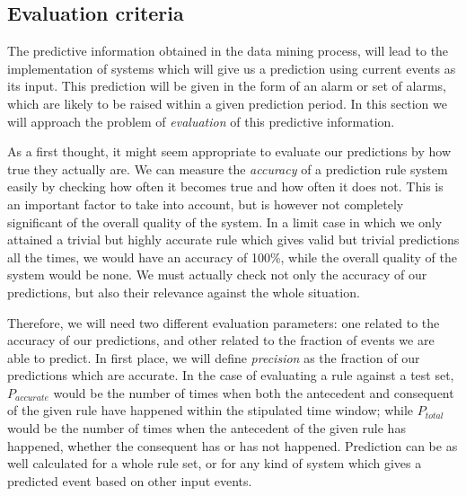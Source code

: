 \documentclass[a4paper,12pt]{article}
\begin{document}

\subsection{Evaluation criteria}
The predictive information obtained in the data mining process, will lead to the implementation of systems which will give us a prediction using current events as its input. This prediction will be given in the form of an alarm or set of alarms, which are likely to be raised within a given prediction period. In this section we will approach the problem of \emph{evaluation} of this predictive information.

As a first thought, it might seem appropriate to evaluate our predictions by how true they actually are. We can measure the \emph{accuracy} of a prediction rule system easily by checking how often it becomes true and how often it does not. This is an important factor to take into account, but is however not completely significant of the overall quality of the system. In a limit case in which we only attained a trivial but highly accurate rule which gives valid but trivial predictions all the times, we would have an accuracy of 100\%, while the overall quality of the system would be none. We must actually check not only the accuracy of our predictions, but also their relevance against the whole situation.

Therefore, we will need two different evaluation parameters: one related to the accuracy of our predictions, and other related to the fraction of events we are able to predict\cite{torgo2003data}. In first place, we will define \emph{precision} as the fraction of our predictions which are accurate. In the case of evaluating a rule against a test set, $P_{accurate}$ would be the number of times when both the antecedent and consequent of the given rule have happened within the stipulated time window; while $P_{total}$ would be the number of times when the antecedent of the given rule has happened, whether the consequent has or has not happened. Prediction can be as well calculated for a whole rule set, or for any kind of system which gives a predicted event based on other input events.
\end{document}
